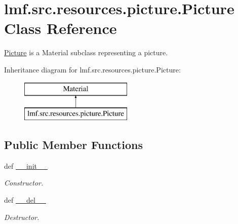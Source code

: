 \hypertarget{classlmf_1_1src_1_1resources_1_1picture_1_1_picture}{\section{lmf.\+src.\+resources.\+picture.\+Picture Class Reference}
\label{classlmf_1_1src_1_1resources_1_1picture_1_1_picture}
}


\hyperlink{classlmf_1_1src_1_1resources_1_1picture_1_1_picture}{Picture} is a Material subclass representing a picture.  


Inheritance diagram for lmf.\+src.\+resources.\+picture.\+Picture\+:\begin{figure}[H]
\begin{center}
\leavevmode
\includegraphics[height=2.000000cm]{classlmf_1_1src_1_1resources_1_1picture_1_1_picture}
\end{center}
\end{figure}
\subsection*{Public Member Functions}
\begin{DoxyCompactItemize}
\item 
def \hyperlink{classlmf_1_1src_1_1resources_1_1picture_1_1_picture_a32a8f644e3c068d7e0e904ba6a484aa8}{\+\_\+\+\_\+init\+\_\+\+\_\+}
\begin{DoxyCompactList}\small\item\em Constructor. \end{DoxyCompactList}\item 
def \hyperlink{classlmf_1_1src_1_1resources_1_1picture_1_1_picture_a9d1e78c17997e8cb029094adaffc904a}{\+\_\+\+\_\+del\+\_\+\+\_\+}
\begin{DoxyCompactList}\small\item\em Destructor. \end{DoxyCompactList}\end{DoxyCompactItemize}
